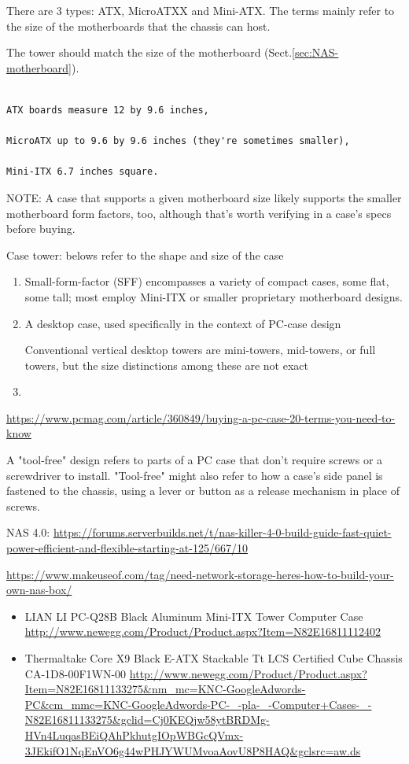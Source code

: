 There are 3 types: ATX, MicroATXX and Mini-ATX. The terms mainly refer to the
size of the motherboards that the chassis can host.

The tower should match the size of the motherboard (Sect.\ref{sec:NAS-motherboard}).
\begin{verbatim}

ATX boards measure 12 by 9.6 inches, 

MicroATX up to 9.6 by 9.6 inches (they're sometimes smaller), 

Mini-ITX 6.7 inches square.

\end{verbatim}

NOTE: A case that supports a given motherboard size likely supports the
smaller motherboard form factors, too, although that's worth verifying in a
case's specs before buying.

Case tower: belows refer to the shape and size of the case
\begin{enumerate}
  \item  Small-form-factor (SFF) encompasses a variety of compact cases, some flat, some
tall; most employ Mini-ITX or smaller proprietary motherboard designs.

  \item A desktop case, used specifically in the context of PC-case design
  
  Conventional vertical desktop towers are mini-towers, mid-towers, or full
  towers, but the size distinctions among these are not exact
  
  \item 
\end{enumerate}
\url{https://www.pcmag.com/article/360849/buying-a-pc-case-20-terms-you-need-to-know}

A "tool-free" design refers to parts of a PC case that don't require screws or a
screwdriver to install. "Tool-free" might also refer to how a case's side panel
is fastened to the chassis, using a lever or button as a release mechanism in
place of screws.
 

NAS 4.0: \url{https://forums.serverbuilds.net/t/nas-killer-4-0-build-guide-fast-quiet-power-efficient-and-flexible-starting-at-125/667/10}

\url{https://www.makeuseof.com/tag/need-network-storage-heres-how-to-build-your-own-nas-box/}

\begin{itemize}
  \item LIAN LI PC-Q28B Black Aluminum Mini-ITX Tower Computer Case
  \url{http://www.newegg.com/Product/Product.aspx?Item=N82E16811112402}
  
  \item Thermaltake Core X9 Black E-ATX Stackable Tt LCS Certified Cube Chassis
  CA-1D8-00F1WN-00
  \url{http://www.newegg.com/Product/Product.aspx?Item=N82E16811133275&nm_mc=KNC-GoogleAdwords-PC&cm_mmc=KNC-GoogleAdwords-PC-_-pla-_-Computer+Cases-_-N82E16811133275&gclid=Cj0KEQjw58ytBRDMg-HVn4LuqasBEiQAhPkhutgIOpWBGcQVmx-3JEkifO1NqEnVO6g44wPHJYWUMvoaAovU8P8HAQ&gclsrc=aw.ds}
\end{itemize}

